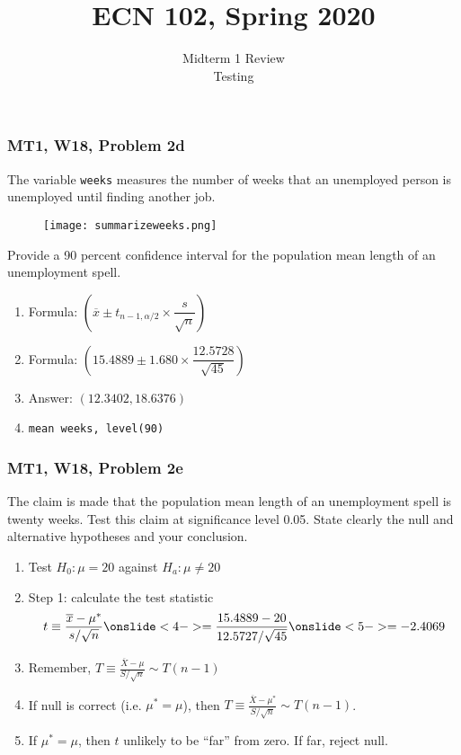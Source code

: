 \documentclass[handout, 9pt]{beamer}
\date{}
\title{ECN 102, Spring 2020}
\author{Midterm 1 Review \\ Testing}
\begin{document}
\begin{frame}
\titlepage
\end{frame}
\small




\begin{frame}
	\frametitle{MT1, W18, Problem 2d}
	The variable \texttt{weeks} measures the number of weeks that an unemployed person is unemployed until finding another job.
	\begin{figure}[H]\centering
		\texttt{[image: summarizeweeks.png]}
	\end{figure}
	
	Provide a 90 percent confidence interval for the population mean length of an unemployment spell.
	\begin{enumerate}
		\item<only@2>	Formula: $\left(\overline{x} \pm t_{n-1,\alpha/2} \times \dfrac{s}{\sqrt{n}}\right)$
		\item<only@3>	Formula: $\left( 15.4889 \pm 1.680 \times \dfrac{12.5728}{\sqrt{45}}\right)$
		\item	<4->Answer: $\left(12.3402, 18.6376\right)$
		\item <5-> \texttt{mean weeks, level(90)}
	\end{enumerate}
\end{frame}








\begin{frame}
	\frametitle{MT1, W18, Problem 2e}
	The claim is made that the population mean length of an unemployment spell is twenty weeks. Test this claim at significance level 0.05. State clearly the null and alternative hypotheses and your conclusion.
	
	\begin{enumerate}
		\item<2-> Test $H_0: \mu = 20$ against $H_a: \mu \neq 20$
		\item<3-> Step 1: calculate the test statistic
		\[
			t \equiv \frac{\overline{x} - \mu^*}{s / \sqrt{n}} \onslide<4-> = \frac{15.4889 - 20}{12.5727/\sqrt{45}}\onslide<5-> = -2.4069
		\]
		\item<6->  Remember, $T \equiv \frac{\overline{X} - \mu}{S / \sqrt{n}} \sim T(n-1)$
		\item<7-> If null is correct (i.e. $\mu^* = \mu$), then $T \equiv \frac{\overline{X} - \mu^*}{S / \sqrt{n}} \sim T(n-1)$.
		\item<8-> If $\mu^* = \mu$, then $t$ unlikely to be ``far'' from zero. If far, reject null. 
	\end{enumerate}
\end{frame}
\end{document}
